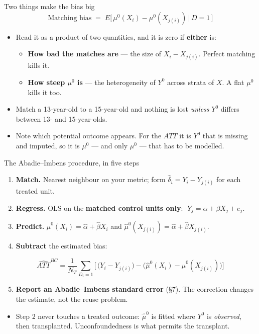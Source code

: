 \documentclass[
  11pt,
  ignorenonframetext,
  aspectratio=169,
]{beamer}
\providecommand{\tightlist}{%
  \setlength{\itemsep}{0pt}\setlength{\parskip}{0pt}}
\begin{document}
\begin{frame}{Two things make the bias big}
\protect{}\label{two-things-make-the-bias-big}
\[
\text{Matching bias} \;=\; E\big[\,\mu^0(X_i) - \mu^0(X_{j(i)}) \,\big|\, D=1\,\big]
\]

\begin{itemize}
\tightlist
\item
  Read it as a product of two quantities, and it is zero if
  \textbf{either} is:

  \begin{itemize}
  \tightlist
  \item
    \textbf{How bad the matches are} --- the size of \(X_i - X_{j(i)}\).
    Perfect matching kills it.
  \item
    \textbf{How steep \(\mu^0\) is} --- the heterogeneity of \(Y^0\)
    across strata of \(X\). A flat \(\mu^0\) kills it too.
  \end{itemize}
\item
  Match a 13-year-old to a 15-year-old and nothing is lost \emph{unless}
  \(Y^0\) differs between 13- and 15-year-olds.
\item
  Note which potential outcome appears. For the \(ATT\) it is \(Y^0\)
  that is missing and imputed, so it is \(\mu^0\) --- and only \(\mu^0\)
  --- that has to be modelled.
\end{itemize}
\end{frame}

\begin{frame}{The Abadie--Imbens procedure, in five steps}
\protect{}\label{the-abadieimbens-procedure-in-five-steps}
\begin{enumerate}
\tightlist
\item
  \textbf{Match.} Nearest neighbour on your metric; form
  \(\hat\delta_i = Y_i - Y_{j(i)}\) for each treated unit.
\item
  \textbf{Regress.} OLS on the \textbf{matched control units only}:
  \(\;Y_{j} = \alpha + \beta X_{j} + e_j\).
\item
  \textbf{Predict.} \(\hat\mu^0(X_i) = \hat\alpha + \hat\beta X_i\) and
  \(\hat\mu^0(X_{j(i)}) = \hat\alpha + \hat\beta X_{j(i)}\).
\item
  \textbf{Subtract} the estimated bias:
\end{enumerate}

\[
\widehat{ATT}^{BC} = \frac{1}{N_T}\sum_{D_i=1}\Big[\,\big(Y_i - Y_{j(i)}\big) - \big(\hat\mu^0(X_i) - \hat\mu^0(X_{j(i)})\big)\Big]
\]

\begin{enumerate}
\setcounter{enumi}{4}
\tightlist
\item
  \textbf{Report an Abadie--Imbens standard error} (§7). The correction
  changes the estimate, not the reuse problem.
\end{enumerate}

\begin{itemize}
\tightlist
\item
  Step 2 never touches a treated outcome: \(\hat\mu^0\) is fitted where
  \(Y^0\) is \emph{observed}, then transplanted. Unconfoundedness is
  what permits the transplant.
\end{itemize}
\end{frame}
\end{document}
